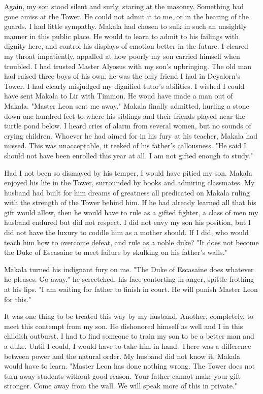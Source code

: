 \documentclass{article}
\begin{document}
Again, my son stood silent and surly, staring at the masonry. Something had gone amiss at the Tower. He could not admit it to me, or in the hearing of the guards. I had little sympathy. Makala had chosen to sulk in such an unsightly manner in this public place. He would to learn to admit to his failings with dignity here, and control his displays of emotion better in the future. I cleared my throat impatiently, appalled at how poorly my son carried himself when troubled. I had trusted Master Alyosus with my son's upbringing.  The old man had raised three boys of his own, he was the only friend I had in Deyalorn's Tower. I had clearly misjudged my dignified tutor's abilities. I wished I could have sent Makala to Lir with Timmon. He woud have made a man out of Makala. "Master Leon sent me away." Makala finally admitted, hurling a stone down one hundred feet to where his siblings and their friends played near the turtle pond below. I heard cries of alarm from several women, but no sounds of crying children. Whoever he had aimed for in his fury at his teacher, Makala had missed. This was unacceptable, it reeked of his father's callousness. "He said I should not have been enrolled this year at all. I am not gifted enough to study."

Had I not been so dismayed by his temper, I would have pitied my son. Makala enjoyed his life in the Tower, surrounded by books and admiring classmates. My husband had built for him dreams of greatness all predicated on Makala ruling with the strength of the Tower behind him. If he had already learned all that his gift would allow, then he would have to rule as a gifted fighter, a class of men my husband endured but did not respect. I did not envy my son his position, but I did not have the luxury to coddle him as a mother should. If I did, who would teach him how to overcome defeat, and rule as a noble duke? "It does not become the Duke of Escasaine to meet failure by skulking on his father's walls." 

Makala turned his indignant fury on me. "The Duke of Escasaine does whatever he pleases. Go away." he screetched, his face contorting in anger, spittle frothing at his lips. "I am waiting for father to finish in court. He will punish Master Leon for this."
  
It was one thing to be treated this way by my husband. Another, completely, to meet this contempt from my son. He dishonored himself as well and I in this childish outburst. I had to find someone to train my son to be a better man and a duke. Until I could, I would have to take him in hand. There was a difference between power and the natural order. My husband did not know it. Makala would have to learn. "Master Leon has done nothing wrong. The Tower does not turn away students without good reason. Your father cannot make your gift stronger. Come away from the wall. We will speak more of this in private." 
\end{document}
